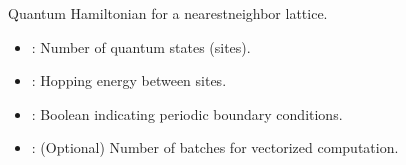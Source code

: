 \documentclass[letterpaper,10pt,english]{sphinxmanual}
\begin{document}
\begin{fulllineitems}
\label{\detokenize{software_reference/ingredients/ingredients:qc_lab.ingredients.nearest_neighbor_lattice_h_q}}
\pysigstartsignatures
\pysiglinewithargsret
{}
{\sphinxparamcomma {}\sphinxparamcomma {}\sphinxparamcomma {}}
{}
\pysigstopsignatures
\sphinxAtStartPar
Quantum Hamiltonian for a nearest\sphinxhyphen{}neighbor lattice.
\begin{description}
\begin{itemize}
\item {} 
\sphinxAtStartPar
{}: Number of quantum states (sites).

\item {} 
\sphinxAtStartPar
{}: Hopping energy between sites.

\item {} 
\sphinxAtStartPar
{}: Boolean indicating periodic boundary conditions.

\end{itemize}

\begin{itemize}
\item {} 
\sphinxAtStartPar
{}: (Optional) Number of batches for vectorized computation.

\end{itemize}

\end{description}

\end{fulllineitems}

\end{document}
